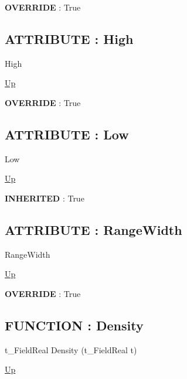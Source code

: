 \par
\par
\textbf{OVERRIDE} : True \\
\subsection*{ATTRIBUTE : High}
\hypertarget{ecldoc:linearregression.ols.tdistribution.high}{}
\begin{minipage}[t]{\textwidth}
\begin{flushleft}
 High 
\end{flushleft}
\end{minipage}
\hyperlink{ecldoc:linearregression.ols.tdistribution}{Up}

\par
\par
\textbf{OVERRIDE} : True \\
\subsection*{ATTRIBUTE : Low}
\hypertarget{ecldoc:linearregression.ols.tdistribution.low}{}
\begin{minipage}[t]{\textwidth}
\begin{flushleft}
 Low 
\end{flushleft}
\end{minipage}
\hyperlink{ecldoc:linearregression.ols.tdistribution}{Up}

\par
\par
\textbf{INHERITED} : True \\
\subsection*{ATTRIBUTE : RangeWidth}
\hypertarget{ecldoc:linearregression.ols.tdistribution.rangewidth}{}
\begin{minipage}[t]{\textwidth}
\begin{flushleft}
 RangeWidth 
\end{flushleft}
\end{minipage}
\hyperlink{ecldoc:linearregression.ols.tdistribution}{Up}

\par
\par
\textbf{OVERRIDE} : True \\
\subsection*{FUNCTION : Density}
\hypertarget{ecldoc:linearregression.ols.tdistribution.density}{}
\begin{minipage}[t]{\textwidth}
\begin{flushleft}
t\_FieldReal Density (t\_FieldReal t)
\end{flushleft}
\end{minipage}
\hyperlink{ecldoc:linearregression.ols.tdistribution}{Up}

